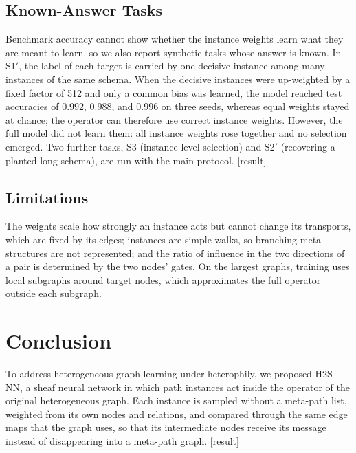 \documentclass{article}
\newcommand{\method}{\textsc{H2S-NN}}
\newcommand{\res}{{\scriptsize[result]}}
\begin{document}
\subsection{Known-Answer Tasks}
Benchmark accuracy cannot show whether the instance weights learn what they are meant to learn, so we also report synthetic tasks whose answer is known. In S1$'$, the label of each target is carried by one decisive instance among many instances of the same schema. When the decisive instances were up-weighted by a fixed factor of 512 and only a common bias was learned, the model reached test accuracies of 0.992, 0.988, and 0.996 on three seeds, whereas equal weights stayed at chance; the operator can therefore use correct instance weights. However, the full model did not learn them: all instance weights rose together and no selection emerged. Two further tasks, S3 (instance-level selection) and S2$'$ (recovering a planted long schema), are run with the main protocol. \res{}

\subsection{Limitations}
The weights scale how strongly an instance acts but cannot change its transports, which are fixed by its edges; instances are simple walks, so branching meta-structures are not represented; and the ratio of influence in the two directions of a pair is determined by the two nodes' gates. On the largest graphs, training uses local subgraphs around target nodes, which approximates the full operator outside each subgraph.

\section{Conclusion}
To address heterogeneous graph learning under heterophily, we proposed \method{}, a sheaf neural network in which path instances act inside the operator of the original heterogeneous graph. Each instance is sampled without a meta-path list, weighted from its own nodes and relations, and compared through the same edge maps that the graph uses, so that its intermediate nodes receive its message instead of disappearing into a meta-path graph. \res{}




\appendix
\end{document}
